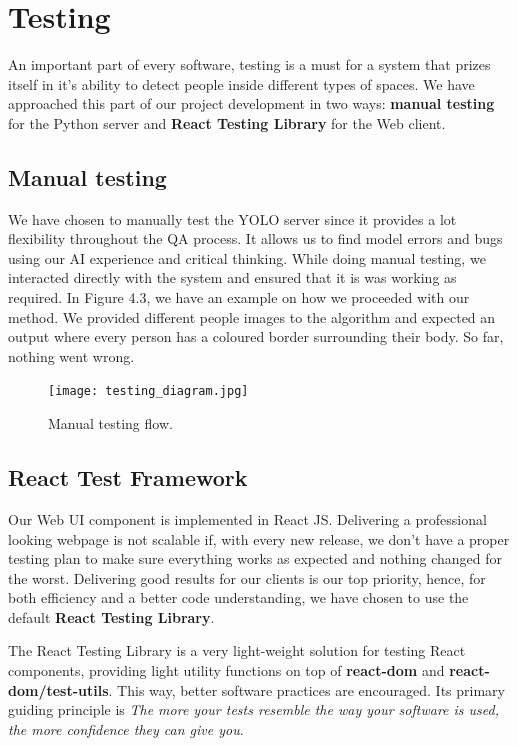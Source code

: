 \documentclass[runningheads,a4paper,11pt]{report}
\begin{document}
\section{Testing}
\label{section:testing}

An important part of every software, testing is a must for a system that prizes itself in it's ability to detect people inside different types of spaces. We have approached this part of our project development in two ways: \textbf{manual testing} for the Python server and \textbf{React Testing Library} for the Web client.

\subsection{Manual testing}

We have chosen to manually test the YOLO server since it provides a lot flexibility throughout the QA process. It allows us to find model errors and bugs using our AI experience and critical thinking. While doing manual testing, we interacted directly with the system and ensured that it is was working as required. 
In Figure 4.3, we have an example on how we proceeded with our method. We provided different people images to the algorithm and expected an output where every person has a coloured border surrounding their body. So far, nothing went wrong.

\begin{figure}[H]
	\centerline{\texttt{[image: testing\_diagram.jpg]}}  
	\caption{Manual testing flow.}
	\label{Flow-diagram}
\end{figure}

\subsection{React Test Framework}
Our Web UI component is implemented in React JS. Delivering a professional looking webpage is not scalable if, with every new release, we don't have a proper testing plan to make sure everything works as expected and nothing changed for the worst. Delivering good results for our clients is our top priority, hence, for both efficiency and a better code understanding, we have chosen to use the default \textbf{React Testing Library}.

The React Testing Library is a very light-weight solution for testing React components, providing light utility functions on top of \textbf{react-dom} and \textbf{react-dom/test-utils}. This way, better software practices are encouraged. Its primary guiding principle is \textit{The more your tests resemble the way your software is used, the more confidence they can give you}.
\end{document}
